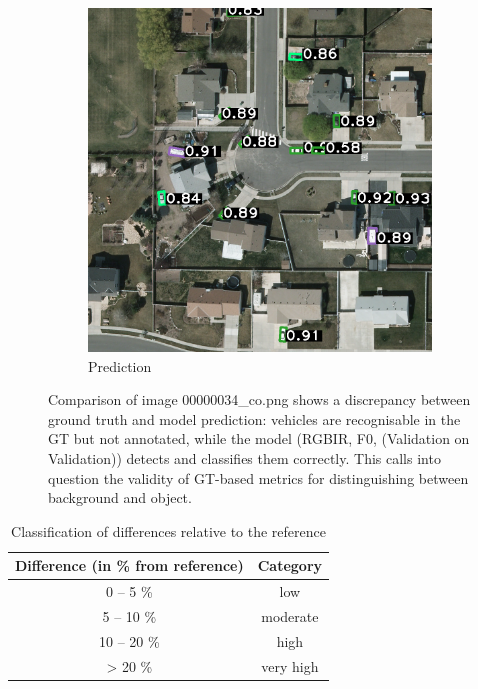 \begin{figure}[h]
\begin{subfigure}[b]{0.45\textwidth}
        \includegraphics[width=\textwidth]{images/015Results/wrong_labels/comp_images/rgbir/34.png} %
        \caption{Prediction} %
        \label{fig:cm_irgb} %
    \end{subfigure}
    \caption{Comparison of image 00000034\_co.png shows a discrepancy between ground truth and model prediction: vehicles are recognisable in the GT but not annotated, while the model (RGBIR, F0, (Validation on Validation)) detects and classifies them correctly. This calls into question the validity of GT-based metrics for distinguishing between background and object.} %
    \label{fig:wrong_labels} %
\end{figure}


\begin{table}[h]
\centering
\begin{tabular}{c c}
\hline
\textbf{Difference (in \% from reference)} & \textbf{Category} \\ \hline
0 -- 5 \%   & low \\ 
5 -- 10 \%  & moderate \\ 
10 -- 20 \% & high \\ 
> 20 \%     & very high \\ \hline
\end{tabular}
\caption{Classification of differences relative to the reference}
\label{tab:diff_cat}
\end{table}

